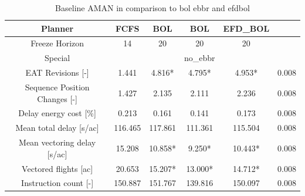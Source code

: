\begin{table}[htbp]
\caption{Baseline AMAN in comparison to bol ebbr and efdbol}
\begin{center}
\footnotesize
\setlength{\tabcolsep}{3pt}
\renewcommand{\arraystretch}{1.000}
\begin{tabular}{|c|c|c|c|c|c|}
\hline
Planner & FCFS & BOL & BOL & EFD\_BOL &  \\
\hline
Freeze Horizon & 14 & 20 & 20 & 20 &  \\
\hline
Special &  &  & no\_ebbr &  &  \\
\hline
EAT Revisions [-] & 1.441 & 4.816* & 4.795* & 4.953* & 0.008 \\
\hline
Sequence Position Changes [-] & 1.427 & 2.135 & 2.111 & 2.236 & 0.008 \\
\hline
Delay energy cost [\%] & 0.213 & 0.161 & 0.141 & 0.173 & 0.008 \\
\hline
Mean total delay [s/ac] & 116.465 & 117.861 & 111.361 & 115.504 & 0.008 \\
\hline
Mean vectoring delay [s/ac] & 15.208 & 10.858* & 9.250* & 10.443* & 0.008 \\
\hline
Vectored flights [ac] & 20.653 & 15.207* & 13.000* & 14.712* & 0.008 \\
\hline
Instruction count [-] & 150.887 & 151.767 & 139.816 & 150.097 & 0.008 \\
\hline
\end{tabular}
\label{tab:baseline\_aman\_in\_comparison\_to\_bol\_ebbr\_and\_efdbol}
\end{center}
\end{table}